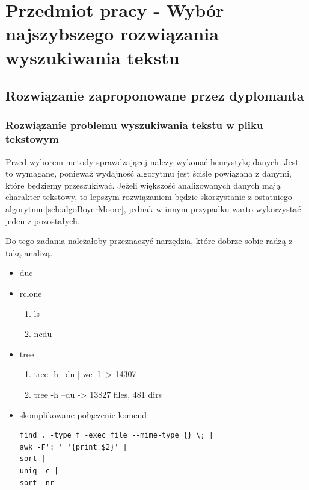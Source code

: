 \chapter{Przedmiot pracy - Wybór najszybszego rozwiązania wyszukiwania tekstu}


\section{Rozwiązanie zaproponowane przez dyplomanta}

\subsection{Rozwiązanie problemu wyszukiwania tekstu w pliku tekstowym}

Przed wyborem metody sprawdzającej należy wykonać heurystykę danych. Jest to 
wymagane, ponieważ wydajność algorytmu jest ściśle powiązana z danymi, które
będziemy przeszukiwać. Jeżeli większość analizowanych danych mają charakter
tekstowy, to lepszym rozwiązaniem będzie skorzystanie z ostatniego algorytmu
\ref{sch:algoBoyerMoore}, jednak w innym przypadku warto wykorzystać jeden z 
pozostałych.

Do tego zadania należałoby przeznaczyć narzędzia, które dobrze sobie radzą z 
taką analizą. 

\begin{itemize}
  \item duc
  \item rclone
  \begin{enumerate}
    \item ls 
    \item ncdu
  \end{enumerate}
  \item tree
  \begin{enumerate}
    \item tree -h --du | wc -l -> 14307
    \item tree -h --du -> 13827 files, 481 dirs
  \end{enumerate}
  \item skomplikowane połączenie komend
  \begin{verbatim}
find . -type f -exec file --mime-type {} \; |
awk -F': ' '{print $2}' |
sort |
uniq -c |
sort -nr
  \end{verbatim}
\end{itemize}

